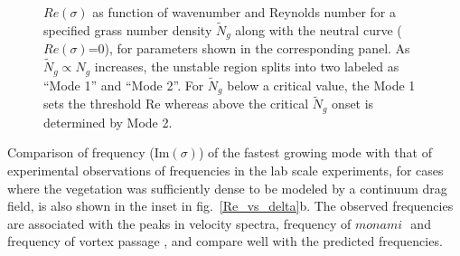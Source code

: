 \documentclass[aps,prl,twocolumn,superscriptaddress,10pt]{revtex4-1}  %
\newcommand{\Rey}{\text{Re}}
\newcommand{\Ndg}{\tilde{N}_g}
\newcommand{\monami}{\textit{monami }}
\begin{document}
\begin{figure}
\begin{tabular}{cccc}
\end{tabular}
\caption{$Re(\sigma)$ as function of wavenumber and Reynolds number for a specified grass number density $\Ndg$ along with the neutral curve ($Re(\sigma)$=0), for parameters shown in the corresponding panel.  
As $\Ndg \propto N_g$ increases, the unstable region splits into two labeled as ``Mode 1'' and ``Mode 2''. 
For $\Ndg$ below a critical value, the Mode 1 sets the threshold $\Rey$ whereas above the critical $\Ndg$ onset is determined by Mode 2.}
\label{K_Re_sigma_set3}
\end{figure}

Comparison of frequency (Im$(\sigma)$) of the fastest growing mode with that of experimental observations of frequencies in
the lab scale experiments, for cases where the vegetation was sufficiently dense to be modeled by a continuum drag field, is also shown in the inset in fig.~\ref{Re_vs_delta}b. 
The observed frequencies are associated with the peaks in velocity spectra, frequency of $\monami$ and frequency of 
vortex passage \cite{Ghisal02}, and compare well with the predicted frequencies. 
\end{document}
